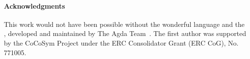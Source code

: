 \paragraph*{Acknowledgments}
This work would not have been possible without the wonderful \agda language and
the \agdastdlib, developed and maintained by The Agda Team~\cite{agdastdlib}.
The first author was supported by the CoCoSym Project under the ERC
Consolidator Grant (ERC CoG), No. 771005.




